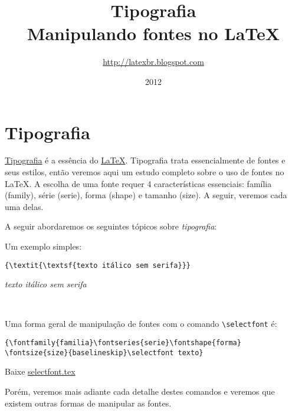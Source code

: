 \documentclass[a4paper]{report}
\title{Tipografia\\ Manipulando fontes no \LaTeX}
\author{\url{http://latexbr.blogspot.com}}
\date{2012}
\begin{document}
\maketitle

\tableofcontents
\clearpage
\pagestyle{plain}
\cleardoublepage

\chapter{Tipografia}

\href{http://pt.wikipedia.org/wiki/Tipografia}{Tipografia} é a essência do \href{http://latexbr.blogspot.com/2010/04/introducao-ao-latex.html}{LaTeX}. Tipografia trata essencialmente de fontes e seus estilos, então veremos aqui um estudo completo sobre o uso de fontes no LaTeX. A escolha de uma fonte requer 4 características essenciais: família (family), série (serie), forma (shape) e tamanho (size). A seguir, veremos cada uma delas.

A seguir abordaremos os seguintes tópicos sobre \emph{tipografia}:


Um exemplo simples:

\verb|{\textit{\textsf{texto itálico sem serifa}}}|

\begin{center}
{\textit{\textsf{texto itálico sem serifa}}}
\end{center}

\

Uma forma geral de manipulação de fontes com o comando \verb|\selectfont| é:

\begin{verbatim}
{\fontfamily{familia}\fontseries{serie}\fontshape{forma}
\fontsize{size}{baselineskip}\selectfont texto}
\end{verbatim}

Baixe \href{}{selectfont.tex}

Porém, veremos mais adiante cada detalhe destes comandos e veremos que existem outras formas de manipular as fontes.
\end{document}
